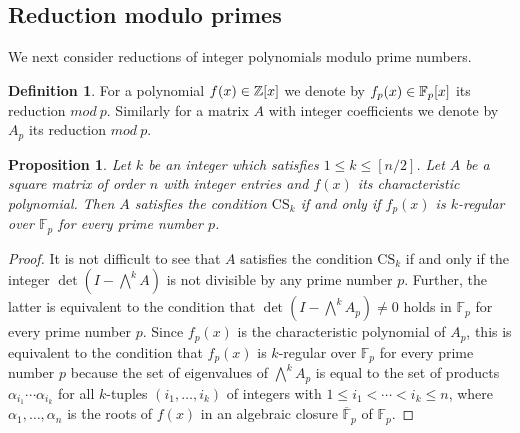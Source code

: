 \documentclass{amsart}
\theoremstyle{plain}
\newtheorem{prop}[thm]{Proposition}
\theoremstyle{definition}
\newtheorem{defn}[thm]{Definition}
\theoremstyle{remark}
\newcommand{\cb}{}
\begin{document}
\subsection{Reduction modulo primes}

We next consider reductions of integer polynomials modulo prime numbers. 
{\cb
\begin{defn}
For  a polynomial $f(x)\in \mathbb Z[x]$ we denote by
$f_p(x)\in\mathbb F_p[x]$
its reduction $mod\ p$.
Similarly for a matrix $A$ with integer coefficients
we denote by  $A_p$ its reduction $mod\ p$.
\end{defn}
}



\begin{prop}\label{CS-regular_p}
Let $k$ be an integer which satisfies $1\leq k\leq [n/2]$. 
Let $A$ be a square matrix of order $n$ with integer entries and $f(x)$ its characteristic polynomial. 
Then $A$ satisfies the condition $\mathrm{CS}_k$ 
if and only if $f_p(x)$ is $k$-regular over $\mathbb{F}_p$ for every prime number $p$. 
\end{prop}

\begin{proof}
It is not difficult to see that $A$ satisfies the condition $\mathrm{CS}_k$ if and only if 
the integer $\det (I-\bigwedge^kA)$ is not divisible by any prime number $p$. 
Further, the latter is equivalent to the condition that $\det(I-\bigwedge^kA_p)\ne 0$ holds in $\mathbb{F}_p$ 
for every prime number $p$. Since $f_p(x)$ is the characteristic polynomial of $A_p$, 
this is equivalent to the condition that $f_p(x)$ is $k$-regular over $\mathbb{F}_p$ for every prime number $p$ 
because the set of eigenvalues of $\bigwedge^kA_p$ is equal to 
the set of products $\alpha_{i_1}\cdots \alpha_{i_k}$ 
for all $k$-tuples $(i_1,\ldots ,i_k)$ of integers with $1\leq i_1<\cdots <i_k\leq n$, 
where $\alpha_1,\ldots ,\alpha_n$ is the roots of $f(x)$ in an algebraic closure $\overline{\mathbb{F}}_p$ 
of $\mathbb{F}_p$. 
\end{proof}
\end{document}
